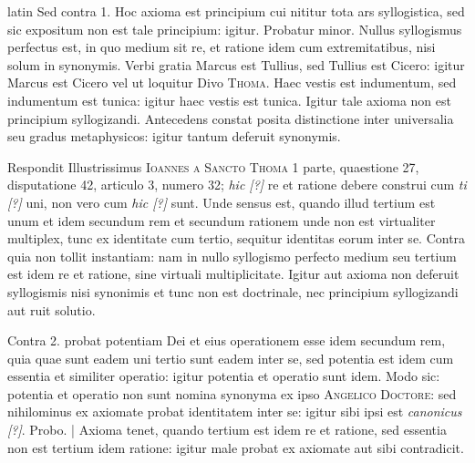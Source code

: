 \begin{otherlanguage*}{latin}
\pstart
Sed contra 1. Hoc axioma est principium cui nititur tota ars syllogistica, sed sic expositum non est tale principium:
igitur. Probatur minor. Nullus syllogismus perfectus est, in quo medium sit re, et ratione idem cum extremitatibus, nisi solum in synonymis. Verbi gratia Marcus est Tullius, sed Tullius est Cicero:
igitur Marcus est Cicero vel ut loquitur Divo \textsc{Thoma}. Haec vestis est indumentum, sed indumentum est tunica:
igitur haec vestis est tunica. Igitur tale axioma non est principium syllogizandi. Antecedens constat posita distinctione inter universalia seu gradus metaphysicos:
igitur tantum deferuit synonymis. 
\pend

\pstart
Respondit Illustrissimus \textsc{Ioannes a Sancto Thoma} 1 parte, quaestione 27, disputatione 42, articulo 3, numero 32; \emph{hic [?]} re et ratione debere construi cum \emph{ti [?]} uni, non vero cum \emph{hic [?]} sunt. Unde sensus est, quando illud tertium est unum et idem secundum rem et secundum rationem unde non est virtualiter multiplex, tunc ex identitate cum tertio, sequitur identitas eorum inter se. Contra quia non tollit instantiam:
nam in nullo syllogismo perfecto medium seu tertium est idem re et ratione, sine virtuali multiplicitate. Igitur aut axioma non deferuit syllogismis nisi synonimis et tunc non est doctrinale, nec principium syllogizandi aut ruit solutio. 
\pend

\pstart
Contra 2.  probat potentiam Dei et eius operationem esse idem secundum rem, quia quae sunt eadem uni tertio sunt eadem inter se, sed potentia est idem cum essentia et similiter operatio:
igitur potentia et operatio sunt idem. Modo sic:
potentia et operatio non sunt nomina synonyma ex ipso \textsc{Angelico Doctore}:
sed nihilominus ex axiomate probat identitatem inter se:
igitur sibi ipsi est \emph{canonicus [?]}. Probo. \textnormal{|} Axioma tenet, quando tertium est idem re et ratione, sed essentia non est tertium idem ratione:
igitur male probat ex axiomate aut sibi contradicit. 
\pend


\end{otherlanguage*}
